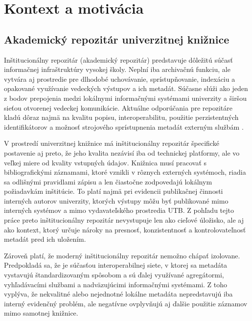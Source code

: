 
\section{Kontext a motivácia}

\subsection{Akademický repozitár univerzitnej knižnice}

Inštitucionálny repozitár (akademický repozitár) predstavuje dôležitú súčasť informačnej infraštruktúry vysokej školy. Neplní iba archivačnú funkciu, ale vytvára aj prostredie pre dlhodobé uchovávanie, sprístupňovanie, indexáciu a opakované využívanie vedeckých výstupov a ich metadát. Súčasne slúži ako jeden z bodov prepojenia medzi lokálnymi informačnými systémami univerzity a širšou sieťou otvorenej vedeckej komunikácie. Aktuálne odporúčania pre repozitáre kladú dôraz najmä na kvalitu popisu, interoperabilitu, použitie perzistentných identifikátorov a možnosť strojového sprístupnenia metadát externým službám \cite{COARGoodPractices2022,OpenAIREGuidelines4}.

V prostredí univerzitnej knižnice má inštitucionálny repozitár špecifické postavenie aj preto, že jeho kvalita nezávisí iba od technickej platformy, ale vo veľkej miere od kvality vstupných údajov. Knižnica musí pracovať s bibliografickými záznamami, ktoré vznikli v rôznych externých systémoch, riadia sa odlišnými pravidlami zápisu a len čiastočne zodpovedajú lokálnym požiadavkám inštitúcie. To platí najmä pri evidencii publikačnej činnosti interných autorov univerzity, ktorých výstupy môžu byť publikované mimo interných systémov a mimo vydavateľského prostredia UTB. Z pohľadu tejto práce preto inštitucionálny repozitár nevystupuje len ako cieľové úložisko, ale aj ako kontext, ktorý určuje nároky na presnosť, konzistentnosť a kontrolovateľnosť metadát pred ich uložením.

Zároveň platí, že moderný inštitucionálny repozitár nemožno chápať izolovane. Predpokladá sa, že je súčasťou interoperabilnej siete, v ktorej sa metadáta vystavujú štandardizovaným spôsobom a sú ďalej využívané agregátormi, vyhľadávacími službami a nadväzujúcimi informačnými systémami. Z toho vyplýva, že nekvalitné alebo nejednotné lokálne metadáta nepredstavujú iba interný evidenčný problém, ale negatívne ovplyvňujú aj ďalšie použitie záznamov mimo samotnej knižnice.

